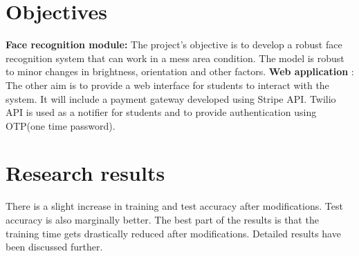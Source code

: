 \section{Objectives}
\textbf{Face recognition module:} The project’s objective is to develop a robust face recognition
system that can work in a mess area condition. The model is robust to minor changes in brightness,
orientation and other factors.
\textbf{Web application} : The other aim is to provide a web interface for students to interact with the
system. It will include a payment gateway developed using Stripe API. Twilio API is used as a notifier for students and to provide authentication using OTP(one time password).

\section{Research results}
There is a slight increase in training and test accuracy after modifications. Test accuracy is also marginally better. The best part of the results is that the training time gets drastically reduced after modifications. Detailed results have been discussed further.